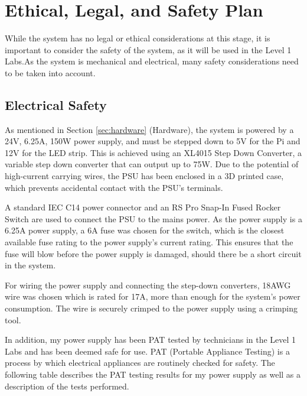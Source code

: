 \section{Ethical, Legal, and Safety Plan}
While the system has no legal or ethical considerations at this stage, it is important to consider the safety of the system,
as it will be used in the Level 1 Labs.As the system is mechanical and electrical, many safety considerations need to be taken into account.
\subsection{Electrical Safety}
As mentioned in Section \ref*{sec:hardware} (Hardware), the system is powered by a 24V, 6.25A, 150W power supply, and must be stepped down to 5V for the Pi and 12V for the LED strip. This is achieved using an XL4015 Step Down Converter\cite{xl4015}, a variable step down converter that can output up to 75W.
Due to the potential of high-current carrying wires, the PSU has been enclosed in a 3D printed case, which prevents accidental contact with the PSU's terminals.

A standard IEC C14 power connector and an RS Pro Snap-In Fused Rocker Switch\cite{rsproc14switch} are used to connect the PSU to the mains power.
As the power supply is a 6.25A power supply, a 6A fuse was chosen for the switch, which is the closest available fuse rating to the power supply's
current rating. This ensures that the fuse will blow before the power supply is damaged, should there be a short circuit in the system.

For wiring the power supply and connecting the step-down converters, 18AWG wire was chosen which is rated for 17A\cite{18awgwire}, 
more than enough for the system's power consumption. The wire is securely crimped to the power supply using a crimping tool.

In addition, my power supply has been PAT tested by technicians in the Level 1 Labs and has been deemed safe for use.
PAT (Portable Appliance Testing) is a process by which electrical appliances are routinely checked for safety\cite{patwiki}\cite{patspec}.
The following table describes the PAT testing results for my power supply as well as a description of the tests performed.

